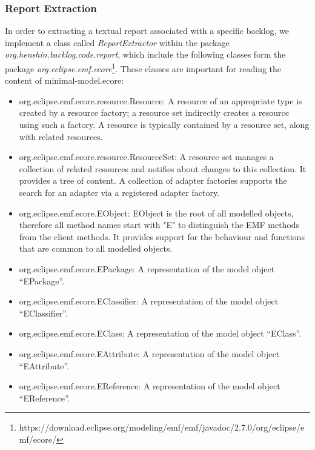 \subsubsection*{Report Extraction}\label{step_report_extraction}
In order to extracting a textual report associated with a specific backlog, we implement a class called \textit{ReportExtractor} within the package \textit{org.henshin.backlog.code.report}, which include the following classes form the package \textit{org.eclipse.emf.ecore}\footnote{https://download.eclipse.org/modeling/emf/emf/javadoc/2.7.0/org/eclipse/emf/ecore/}. These classes are important for reading the content of minimal-model.ecore:
\begin{itemize}
	
	\item org.eclipse.emf.ecore.resource.Resource: A resource of an appropriate type is created by a resource factory; a resource set indirectly creates a resource using such a factory. A resource is typically contained by a resource set, along with related resources.
	
	\item org.eclipse.emf.ecore.resource.ResourceSet: A resource set manages a collection of related resources and notifies about changes to this collection. It provides a tree of content. A collection of adapter factories supports the search for an adapter via a registered adapter factory. 
	
	\item org.eclipse.emf.ecore.EObject: EObject is the root of all modelled objects, therefore all method names start with "E" to distinguish the EMF methods from the client methods. It provides support for the behaviour and functions that are common to all modelled objects.
	
	\item org.eclipse.emf.ecore.EPackage: A representation of the model object \enquote{EPackage}.
	
	\item org.eclipse.emf.ecore.EClassifier: A representation of the model object \enquote{EClassifier}.
	
	\item org.eclipse.emf.ecore.EClass: A representation of the model object \enquote{EClass}.
	
	\item org.eclipse.emf.ecore.EAttribute: A representation of the model object \enquote{EAttribute}.
	
	\item org.eclipse.emf.ecore.EReference:  A representation of the model object \enquote{EReference}.
	
\end{itemize}
